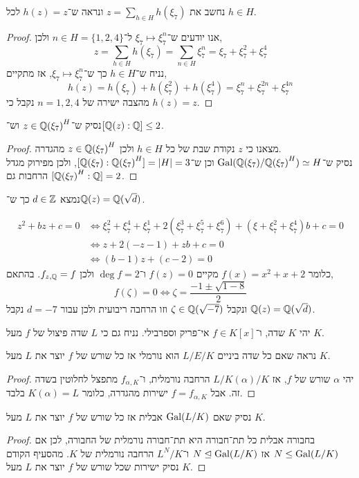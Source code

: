 \subquestion{}
נחשב את $z = \sum_{h \in H} h(\xi_7)$ ונראה ש־$h(z) = z$ לכל $h \in H$.
\begin{proof}
	אנו יודעים ש־$\xi_7 \mapsto \xi_7^n$ ל־$n \in H = \{1, 2, 4\}$ ולכן,
	\[
		z
		= \sum_{h \in H} h(\xi_7)
		= \sum_{n \in H} \xi_7^n
		= \xi_7 + \xi_7^2 + \xi_7^4
	\]
	נניח ש־$h \in H$ כך ש־$\xi_7 \mapsto \xi_7^n$, אז מתקיים,
	\[
		h(z)
		= h(\xi_7) + h(\xi_7^2) + h(\xi_7^4)
		= \xi_7^n + \xi_7^{2n} + \xi_7^{4n}
	\]
	מהצבה ישירה של $n = 1, 2, 4$ נקבל כי $h(z) = z$.
\end{proof}

\subquestion{}
נסיק ש־$z \in {\mathbb{Q}(\xi_7)}^H$ וש־$[\mathbb{Q}(z) : \mathbb{Q}] \le 2$.
\begin{proof}
	מצאנו כי $z$ נקודת שבת של כל $h \in H$ ולכן $z \in {\mathbb{Q}(\xi_7)}^H$ מהגדרה. \\
	נסיק ש־$\operatorname{Gal}(\mathbb{Q}(\xi_7) / {\mathbb{Q}(\xi_7)}^H) \simeq H$ וכן ש־$[\mathbb{Q}(\xi_7) : {\mathbb{Q}(\xi_7)}^H] = |H| = 3$, ולכן מפירוק מגדל הרחבות גם $[{\mathbb{Q}(\xi_7)}^H : \mathbb{Q}] = 2$.
\end{proof}

\subquestion{}
נמצא $d \in \mathbb{Z}$ כך ש־$\mathbb{Q}(z) = \mathbb{Q}(\sqrt{d})$.
\begin{solution}
	\begin{align*}
		z^2 + b z + c = 0
		& \iff \xi_7^2 + \xi_7^4 + \xi_7^1 + 2(\xi_7^3 + \xi_7^5 + \xi_7^6) + (\xi + \xi_7^2 + \xi_7^4) b + c = 0 \\
		& \iff z + 2(-z - 1) + z b + c = 0 \\
		& \iff (b - 1) z + (c - 2) = 0
	\end{align*}
	כלומר $f(x) = x^2 + x + 2$ מקיים $f(z) = 0$ ו־$\deg f = 2$ ולכן $f_{z, \mathbb{Q}} = f$.
	בהתאם,
	\[
		f(\zeta) = 0
		\iff \zeta = \frac{-1 \pm \sqrt{1 - 8}}{2}
	\]
	ונקבל $\zeta \in \mathbb{Q}(\sqrt{-7})$ וזו הרחבה ריבועית ולכן עבור $d = -7$ נקבל $\mathbb{Q}(z) = \mathbb{Q}(\sqrt{d})$.
\end{solution}

\question{}
יהי $K$ שדה, ו־$f \in K[x]$ אי־פריק וספרבילי.
נניח גם כי $L$ שדה פיצול של $f$ מעל $K$.

\subquestion{}
נראה שאם כל שדה ביניים $L / E / K$ הוא נורמלי אז כל שורש של $f$ יוצר את $L$ מעל $K$.
\begin{proof}
	יהי $\alpha$ שורש של $f$, אז $L / K(\alpha) / K$ הרחבה נורמלית, ו־$f_{\alpha, K}$ מתפצל לחלוטין בשדה זה.
	אבל $f = f_{\alpha, K}$ ישירות מהגדרה, כלומר $K(\alpha) = L$ בלבד.
\end{proof}

\subquestion{}
נסיק שאם $\operatorname{Gal}(L / K)$ אבלית אז כל שורש של $f$ יוצר את $L$ מעל $K$.
\begin{proof}
	בחבורה אבלית כל תת־חבורה היא תת־חבורה נורמלית של החבורה, לכן אם $N \le \operatorname{Gal}(L / K)$ אז $N \trianglelefteq \operatorname{Gal}(L / K)$ ו־$L^N / K$ הרחבה נורמלית של $K$.
	מהסעיף הקודם נסיק ישירות שכל שורש של $f$ יוצר את $L$ מעל $K$.
\end{proof}


